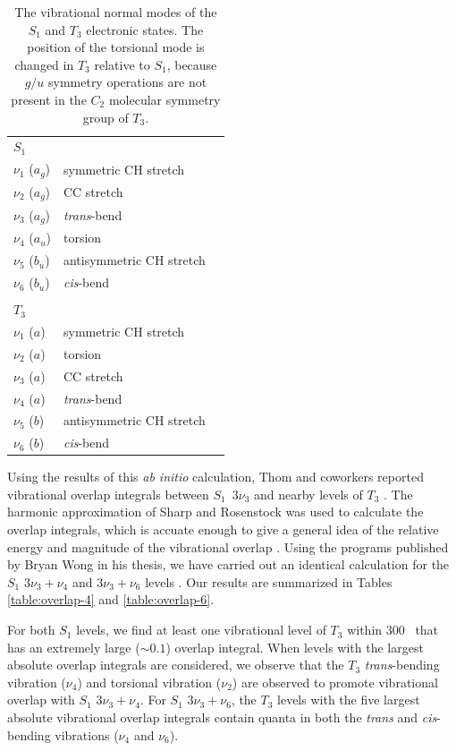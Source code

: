 \begin{table}
  \caption{The vibrational normal modes of the $S_1$ and $T_3$
    electronic states. The
    position of the torsional mode is changed in $T_3$ relative to
    $S_1$, because $g/u$ symmetry operations are not present in the 
    $C_2$ molecular symmetry group of $T_3$.
  }
  \label{table:vibration-ids}
  \centering
  \vspace{5mm}
  \begin{tabular}{llc}
    \toprule
    $S_1$\\
    $\nu_1$ ($a_g$) & symmetric CH stretch \\
    $\nu_2$ ($a_g$) & CC stretch \\
    $\nu_3$ ($a_g$) & \emph{trans}-bend \\
    $\nu_4$ ($a_u$) & torsion \\
    $\nu_5$ ($b_u$) & antisymmetric CH stretch \\
    $\nu_6$ ($b_u$) & \emph{cis}-bend \\
    \\
    $T_3$\\
    $\nu_1$ ($a$) & symmetric CH stretch \\
    $\nu_2$ ($a$) & torsion \\
    $\nu_3$ ($a$) & CC stretch \\
    $\nu_4$ ($a$) & \emph{trans}-bend \\
    $\nu_5$ ($b$) & antisymmetric CH stretch \\
    $\nu_6$ ($b$) & \emph{cis}-bend \\
    \bottomrule
  \end{tabular}
\end{table}

Using the results of this \emph{ab initio} calculation, Thom and
coworkers reported vibrational overlap integrals between $S_1 \:\;
3\nu_3$ and nearby levels of $T_3$ \cite{thom07}.  The harmonic
approximation of Sharp and Rosenstock was used to calculate the
overlap integrals, which is accuate enough to give a general idea of
the relative energy and magnitude of the vibrational overlap
\cite{sharp64}.  Using the programs published by Bryan Wong in his
thesis, we have carried out an identical calculation for the $S_1$
$3\nu_3+\nu_4$ and $3\nu_3+\nu_6$ levels \cite{wong07}.  Our results
are summarized in Tables \ref{table:overlap-4} and
\ref{table:overlap-6}.

For both $S_1$ levels, we find at least one vibrational level of $T_3$
within 300 \rcm\ that has an extremely large ($\sim 0.1$) overlap
integral.  When levels with the largest absolute overlap integrals
are considered, we observe that the $T_3$ \emph{trans}-bending
vibration ($\nu_4$) and torsional vibration ($\nu_2$) are observed to
promote vibrational overlap with $S_1$ $3\nu_3+\nu_4$.  For $S_1$
$3\nu_3+\nu_6$, the $T_3$ levels with the five largest absolute
vibrational overlap integrals contain quanta in both the \emph{trans}
and \emph{cis}-bending vibrations ($\nu_4$ and $\nu_6$).



